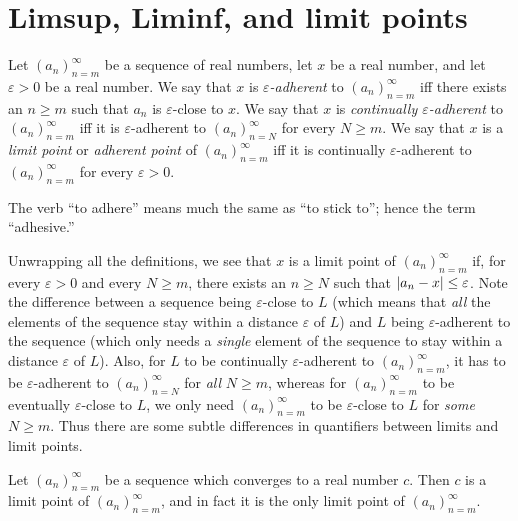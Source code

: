 \section{Limsup, Liminf, and limit points}\label{i:sec:6.4}

\begin{defn}\label{i:6.4.1}
  Let \((a_n)_{n = m}^\infty\) be a sequence of real numbers, let \(x\) be a real number, and let \(\varepsilon > 0\) be a real number.
  We say that \(x\) is \emph{\(\varepsilon\)-adherent} to \((a_n)_{n = m}^\infty\) iff there exists an \(n \geq m\) such that \(a_n\) is \(\varepsilon\)-close to \(x\).
  We say that \(x\) is \emph{continually \(\varepsilon\)-adherent} to \((a_n)_{n = m}^\infty\) iff it is \(\varepsilon\)-adherent to \((a_n)_{n = N}^\infty\) for every \(N \geq m\).
  We say that \(x\) is a \emph{limit point} or \emph{adherent point} of \((a_n)_{n = m}^\infty\) iff it is continually \(\varepsilon\)-adherent to \((a_n)_{n = m}^\infty\) for every \(\varepsilon > 0\).
\end{defn}

\begin{rmk}\label{i:6.4.2}
  The verb ``to adhere'' means much the same as ``to stick to'';
  hence the term ``adhesive.''
\end{rmk}

\begin{note}
  Unwrapping all the definitions, we see that \(x\) is a limit point of \((a_n)_{n = m}^\infty\) if, for every \(\varepsilon > 0\) and every \(N \geq m\), there exists an \(n \geq N\) such that \(\left\lvert a_n - x\right\rvert \leq \varepsilon\).
  Note the difference between a sequence being \(\varepsilon\)-close to \(L\)
  (which means that \emph{all} the elements of the sequence stay within a distance \(\varepsilon\) of \(L\))
  and \(L\) being \(\varepsilon\)-adherent to the sequence
  (which only needs a \emph{single} element of the sequence to stay within a distance \(\varepsilon\) of \(L\)).
  Also, for \(L\) to be continually \(\varepsilon\)-adherent to \((a_n)_{n = m}^\infty\), it has to be \(\varepsilon\)-adherent to \((a_n)_{n = N}^\infty\) for \emph{all} \(N \geq m\), whereas for \((a_n)_{n = m}^\infty\) to be eventually \(\varepsilon\)-close to \(L\), we only need \((a_n)_{n = m}^\infty\) to be \(\varepsilon\)-close to \(L\) for \emph{some} \(N \geq m\).
  Thus there are some subtle differences in quantifiers between limits and limit points.
\end{note}

\setcounter{thm}{4}
\begin{prop}\label{i:6.4.5}
  Let \((a_n)_{n = m}^\infty\) be a sequence which converges to a real number \(c\).
  Then \(c\) is a limit point of \((a_n)_{n = m}^\infty\), and in fact it is the only limit point of \((a_n)_{n = m}^\infty\).
\end{prop}


